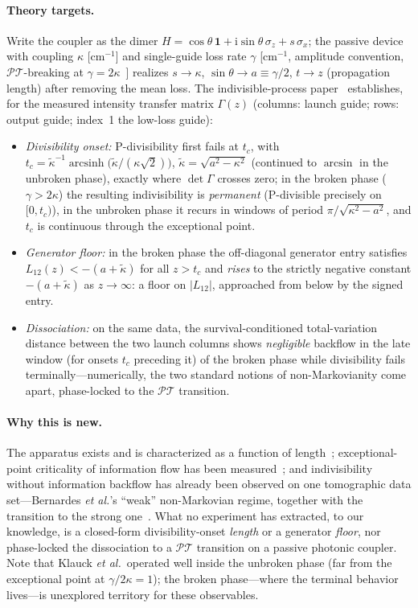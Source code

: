 \documentclass[11pt]{article}
\newcommand{\PT}{\mathcal{PT}}
\newcommand{\ii}{\mathrm{i}}
\begin{document}
\paragraph{Theory targets.} Write the coupler as the dimer
$H=\cos\theta\,\mathbf{1}+\ii\sin\theta\,\sigma_z+s\,\sigma_x$; the
passive device with coupling $\kappa$ [cm$^{-1}$] and single-guide
loss rate $\gamma$ [cm$^{-1}$, amplitude convention, $\PT$-breaking at
$\gamma=2\kappa$~\cite{Klauck2019}] realizes $s\to\kappa$,
$\sin\theta\to a\equiv\gamma/2$, $t\to z$ (propagation length) after
removing the mean loss. The indivisible-process paper~\cite{indivisible}
establishes, for the measured
intensity transfer matrix $\Gamma(z)$ (columns: launch guide; rows:
output guide; index~1 the low-loss guide):
\begin{itemize}\setlength\itemsep{0pt}
\item \emph{Divisibility onset:} P-divisibility first fails at $t_c$,
with
$t_c=\tilde\kappa^{-1}\operatorname{arcsinh}\!\bigl(\tilde\kappa/(\kappa\sqrt2)\bigr)$,
$\tilde\kappa=\sqrt{a^2-\kappa^2}$ (continued to $\arcsin$ in the
unbroken phase), exactly where $\det\Gamma$ crosses
zero; in the broken phase ($\gamma>2\kappa$) the resulting
indivisibility is \emph{permanent} (P-divisible precisely on $[0,t_c)$),
in the unbroken phase it recurs in
windows of period $\pi/\sqrt{\kappa^2-a^2}$, and $t_c$ is continuous
through the exceptional point.
\item \emph{Generator floor:} in the broken phase the off-diagonal
generator entry satisfies $L_{12}(z)<-(a+\tilde\kappa)$ for all
$z>t_c$ and \emph{rises} to the strictly negative constant
$-(a+\tilde\kappa)$ as $z\to\infty$: a floor on $|L_{12}|$,
approached from below by the signed entry.
\item \emph{Dissociation:} on the same data, the survival-conditioned
total-variation distance between the two launch columns shows
\emph{negligible} backflow in the late window (for onsets $t_c$
preceding it) of the broken phase while divisibility fails
terminally---numerically, the two standard
notions of non-Markovianity come
apart, phase-locked to the $\PT$ transition.
\end{itemize}

\paragraph{Why this is new.} The apparatus exists and is
characterized as a function of length~\cite{Klauck2019}; exceptional-point
criticality of information flow has been measured~\cite{Xiao2019}; and
indivisibility without information backflow has already been observed
on one tomographic data set---Bernardes \emph{et al.}'s ``weak''
non-Markovian regime, together with the transition to the strong
one~\cite{Bernardes2015}. What no experiment has extracted, to our
knowledge, is a closed-form divisibility-onset \emph{length} or a
generator \emph{floor}, nor phase-locked the dissociation to a $\PT$
transition on a passive photonic coupler. Note that Klauck
\emph{et al.}\ operated well inside the unbroken phase (far from the
exceptional point at $\gamma/2\kappa=1$); the broken
phase---where the terminal behavior lives---is unexplored territory
for these observables.
\end{document}
